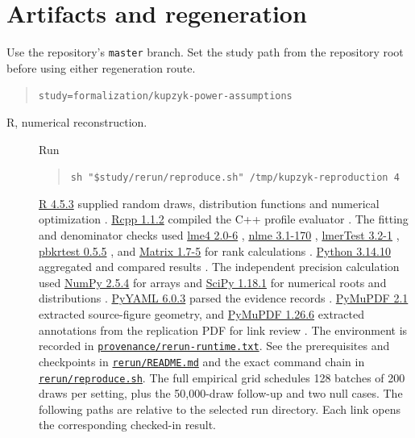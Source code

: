 \appendix
\section{Artifacts and regeneration}\label{sec:artifacts}
Use the repository's \texttt{master} branch. Set the study path from the repository root before using either regeneration route.
\begin{quote}
\small\verb|study=formalization/kupzyk-power-assumptions|
\end{quote}

\begin{description}
\item[R, numerical reconstruction.] Run
\begin{quote}
\small\verb|sh "$study/rerun/reproduce.sh" /tmp/kupzyk-reproduction 4|
\end{quote}
\href{https://www.r-project.org/}{R 4.5.3} supplied random draws, distribution functions and numerical optimization \citep{rcore2026}. \href{https://cran.r-project.org/package=Rcpp}{Rcpp 1.1.2} compiled the C++ profile evaluator \citep{eddelbuettel2011}. The fitting and denominator checks used \href{https://cran.r-project.org/package=lme4}{lme4 2.0-6} \citep{bates2015}, \href{https://cran.r-project.org/package=nlme}{nlme 3.1-170} \citep{nlme2026}, \href{https://cran.r-project.org/package=lmerTest}{lmerTest 3.2-1} \citep{kuznetsova2017}, \href{https://cran.r-project.org/package=pbkrtest}{pbkrtest 0.5.5} \citep{halekoh2014}, and \href{https://cran.r-project.org/package=Matrix}{Matrix 1.7-5} for rank calculations \citep{matrix2026}.
\href{https://www.python.org/}{Python 3.14.10} aggregated and compared results \citep{python2026}. The independent precision calculation used \href{https://numpy.org/}{NumPy 2.5.4} for arrays \citep{harris2020} and \href{https://scipy.org/}{SciPy 1.18.1} for numerical roots and distributions \citep{virtanen2020}. \href{https://pyyaml.org/}{PyYAML 6.0.3} parsed the evidence records \citep{pyyaml2026}. \href{https://github.com/pymupdf/PyMuPDF}{PyMuPDF 2.1} extracted source-figure geometry, and \href{https://github.com/pymupdf/PyMuPDF}{PyMuPDF 1.26.6} extracted annotations from the replication PDF for link review \citep{pymupdf2026}.
The environment is recorded in \href{https://github.com/alectionary/vibe-math/blob/master/formalization/kupzyk-power-assumptions/provenance/rerun-runtime.txt}{\nolinkurl{provenance/rerun-runtime.txt}}. See the prerequisites and checkpoints in \href{https://github.com/alectionary/vibe-math/blob/master/formalization/kupzyk-power-assumptions/rerun/README.md}{\nolinkurl{rerun/README.md}} and the exact command chain in \href{https://github.com/alectionary/vibe-math/blob/master/formalization/kupzyk-power-assumptions/rerun/reproduce.sh}{\nolinkurl{rerun/reproduce.sh}}. The full empirical grid schedules 128 batches of 200 draws per setting, plus the 50,000-draw follow-up and two null cases.  The following paths are relative to the selected run directory. Each link opens the corresponding checked-in result.


\end{description}
